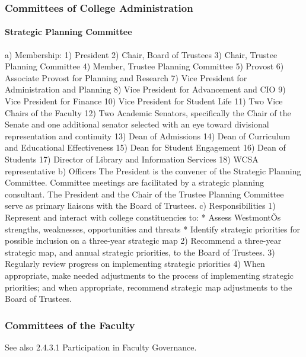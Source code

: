 \documentclass[letterpaper, 11pt]{article}
\begin{document}
		\subsubsection{Committees of College Administration}
			\paragraph{Strategic Planning Committee}
				a)	Membership:
				1) President
				2) Chair, Board of Trustees
				3) Chair, Trustee Planning Committee
				4) Member, Trustee Planning Committee
				5) Provost
				6) Associate Provost for Planning and Research
				7) Vice President for Administration and Planning
				8) Vice President for Advancement and CIO
				9) Vice President for Finance
				10) Vice President for Student Life
				11) Two Vice Chairs of the Faculty
				12) Two Academic Senators, specifically the Chair of the Senate and one additional senator selected with an eye toward divisional representation and continuity
				13) Dean of Admissions
				14) Dean of Curriculum and Educational Effectiveness
				15) Dean for Student Engagement
				16) Dean of Students
				17) Director of Library and Information Services
				18) WCSA representative
				b)  Officers
				The President is the convener of the Strategic Planning Committee.  Committee meetings are facilitated by a strategic planning consultant.  The President and the Chair of the Trustee Planning Committee serve as primary liaisons with the Board of Trustees.
				c) Responsibilities
				1) Represent and interact with college constituencies to:
				* Assess WestmontÕs strengths, weaknesses, opportunities and threats
				* Identify strategic priorities for possible inclusion on a three-year strategic map
				2) Recommend a three-year strategic map, and annual strategic priorities, to the Board of Trustees.
				3) Regularly review progress on implementing strategic priorities
				4) When appropriate, make needed adjustments to the process of implementing strategic priorities; and when appropriate, recommend strategic map adjustments to the Board of Trustees.

		\subsubsection{Committees of the Faculty}
			See also 2.4.3.1 Participation in Faculty Governance.
\end{document}
